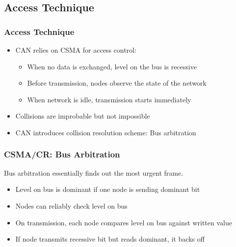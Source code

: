 \documentclass{beamer}
\begin{document}
\subsection{Access Technique}
\begin{frame}
	\frametitle{Access Technique}
	\begin{itemize}
		\item CAN relies on CSMA for access control:
		\begin{itemize}
			\item When no data is exchanged, level on the bus is recessive
			\item Before transmission, nodes observe the state of the network
			\item When network is idle, transmission starts immediately
		\end{itemize}
		\item Collisions are improbable but not impossible
		\item CAN introduces collision resolution scheme: Bus arbitration
	\end{itemize}	
\end{frame}

\begin{frame}
	\frametitle{CSMA/CR: Bus Arbitration}
	Bus arbitration essentially finds out the most urgent frame.
	\vfill
	\begin{itemize}
		\item Level on bus is dominant if one node is sending dominant bit
		\item Nodes can reliably check level on bus
		\item On transmission, each node compares level on bus against written value
		\item If node transmits recessive bit but reads dominant, it backs off
	\end{itemize}	
\end{frame}
\end{document}
